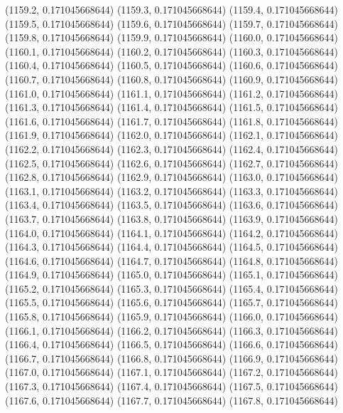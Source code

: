 {					(1159.2, 0.171045668644)
					(1159.3, 0.171045668644)
					(1159.4, 0.171045668644)
					(1159.5, 0.171045668644)
					(1159.6, 0.171045668644)
					(1159.7, 0.171045668644)
					(1159.8, 0.171045668644)
					(1159.9, 0.171045668644)
					(1160.0, 0.171045668644)
					(1160.1, 0.171045668644)
					(1160.2, 0.171045668644)
					(1160.3, 0.171045668644)
					(1160.4, 0.171045668644)
					(1160.5, 0.171045668644)
					(1160.6, 0.171045668644)
					(1160.7, 0.171045668644)
					(1160.8, 0.171045668644)
					(1160.9, 0.171045668644)
					(1161.0, 0.171045668644)
					(1161.1, 0.171045668644)
					(1161.2, 0.171045668644)
					(1161.3, 0.171045668644)
					(1161.4, 0.171045668644)
					(1161.5, 0.171045668644)
					(1161.6, 0.171045668644)
					(1161.7, 0.171045668644)
					(1161.8, 0.171045668644)
					(1161.9, 0.171045668644)
					(1162.0, 0.171045668644)
					(1162.1, 0.171045668644)
					(1162.2, 0.171045668644)
					(1162.3, 0.171045668644)
					(1162.4, 0.171045668644)
					(1162.5, 0.171045668644)
					(1162.6, 0.171045668644)
					(1162.7, 0.171045668644)
					(1162.8, 0.171045668644)
					(1162.9, 0.171045668644)
					(1163.0, 0.171045668644)
					(1163.1, 0.171045668644)
					(1163.2, 0.171045668644)
					(1163.3, 0.171045668644)
					(1163.4, 0.171045668644)
					(1163.5, 0.171045668644)
					(1163.6, 0.171045668644)
					(1163.7, 0.171045668644)
					(1163.8, 0.171045668644)
					(1163.9, 0.171045668644)
					(1164.0, 0.171045668644)
					(1164.1, 0.171045668644)
					(1164.2, 0.171045668644)
					(1164.3, 0.171045668644)
					(1164.4, 0.171045668644)
					(1164.5, 0.171045668644)
					(1164.6, 0.171045668644)
					(1164.7, 0.171045668644)
					(1164.8, 0.171045668644)
					(1164.9, 0.171045668644)
					(1165.0, 0.171045668644)
					(1165.1, 0.171045668644)
					(1165.2, 0.171045668644)
					(1165.3, 0.171045668644)
					(1165.4, 0.171045668644)
					(1165.5, 0.171045668644)
					(1165.6, 0.171045668644)
					(1165.7, 0.171045668644)
					(1165.8, 0.171045668644)
					(1165.9, 0.171045668644)
					(1166.0, 0.171045668644)
					(1166.1, 0.171045668644)
					(1166.2, 0.171045668644)
					(1166.3, 0.171045668644)
					(1166.4, 0.171045668644)
					(1166.5, 0.171045668644)
					(1166.6, 0.171045668644)
					(1166.7, 0.171045668644)
					(1166.8, 0.171045668644)
					(1166.9, 0.171045668644)
					(1167.0, 0.171045668644)
					(1167.1, 0.171045668644)
					(1167.2, 0.171045668644)
					(1167.3, 0.171045668644)
					(1167.4, 0.171045668644)
					(1167.5, 0.171045668644)
					(1167.6, 0.171045668644)
					(1167.7, 0.171045668644)
					(1167.8, 0.171045668644)
}
